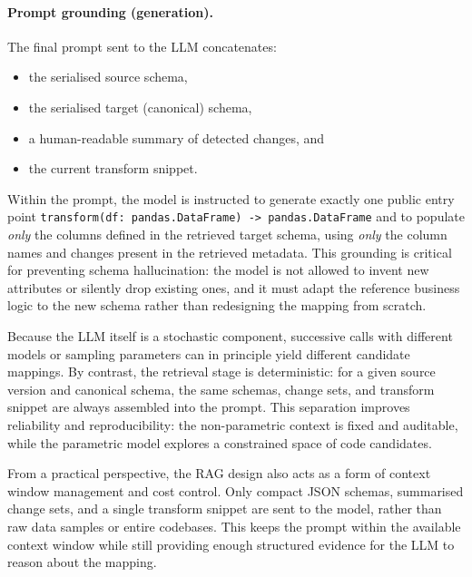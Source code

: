 \paragraph{Prompt grounding (generation).}
The final prompt sent to the LLM concatenates:
%
\begin{itemize}
  \item the serialised source schema,
  \item the serialised target (canonical) schema,
  \item a human-readable summary of detected changes, and
  \item the current transform snippet.
\end{itemize}
%
Within the prompt, the model is instructed to generate exactly one public entry point
\texttt{transform(df: pandas.DataFrame) -> pandas.DataFrame} and to populate \emph{only} the
columns defined in the retrieved target schema, using \emph{only} the column names and changes
present in the retrieved metadata. This grounding is critical for preventing schema hallucination:
the model is not allowed to invent new attributes or silently drop existing ones, and it must adapt
the reference business logic to the new schema rather than redesigning the mapping from scratch.

Because the LLM itself is a stochastic component, successive calls with different models or
sampling parameters can in principle yield different candidate mappings. By contrast, the retrieval
stage is deterministic: for a given source version and canonical schema, the same schemas, change
sets, and transform snippet are always assembled into the prompt. This separation improves
reliability and reproducibility: the non-parametric context is fixed and auditable, while the
parametric model explores a constrained space of code candidates.

From a practical perspective, the RAG design also acts as a form of context window management and
cost control. Only compact JSON schemas, summarised change sets, and a single transform snippet are
sent to the model, rather than raw data samples or entire codebases. This keeps the prompt within
the available context window while still providing enough structured evidence for the LLM to reason
about the mapping.

